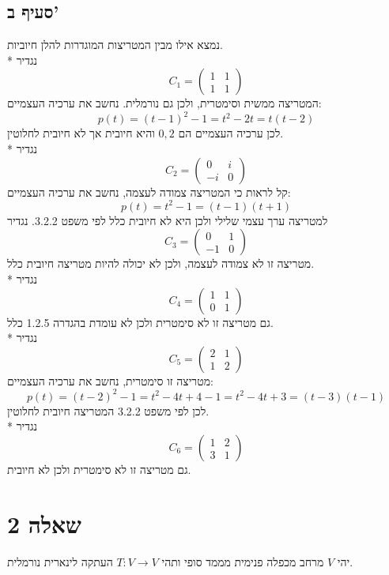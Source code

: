 \subsection{סעיף ב'}
נמצא אילו מבין המטריצות המוגדרות להלן חיוביות. \\*
נגדיר
\[
	C_1 = \begin{pmatrix}
		1 & 1 \\
		1 & 1
	\end{pmatrix}
\]
המטריצה ממשית וסימטרית, ולכן גם נורמלית. נחשב את ערכיה העצמיים:
\[
	p(t) = (t - 1)^2 - 1 = t^2 - 2t = t(t - 2)
\]
לכן ערכיה העצמיים הם $0, 2$ והיא חיובית אך לא חיובית לחלוטין. \\*
נגדיר
\[
	C_2 = \begin{pmatrix}
		0 & i \\
		-i & 0
	\end{pmatrix}
\]
קל לראות כי המטריצה צמודה לעצמה, נחשב את ערכיה העצמיים:
\[
	p(t) = t^2 - 1 = (t - 1)(t + 1)
\]
למטריצה ערך עצמי שלילי ולכן היא לא חיובית כלל לפי משפט 3.2.2.
נגדיר
\[
	C_3 = \begin{pmatrix}
		0 & 1 \\
		-1 & 0
	\end{pmatrix}
\]
מטריצה זו לא צמודה לעצמה, ולכן לא יכולה להיות מטריצה חיובית כלל. \\*
נגדיר
\[
	C_4 = \begin{pmatrix}
		1 & 1 \\
		0 & 1
	\end{pmatrix}
\]
גם מטריצה זו לא סימטרית ולכן לא עומדת בהגדרה 1.2.5 כלל. \\*
נגדיר
\[
	C_5 = \begin{pmatrix}
		2 & 1 \\
		1 & 2
	\end{pmatrix}
\]
מטריצה זו סימטרית, נחשב את ערכיה העצמיים:
\[
	p(t) = (t - 2)^2 - 1 = t^2 - 4t + 4 - 1 = t^2 - 4t + 3 = (t - 3)(t - 1)
\]
לכן לפי משפט 3.2.2 המטריצה חיובית לחלוטין. \\*
נגדיר
\[
	C_6 = \begin{pmatrix}
		1 & 2 \\
		3 & 1
	\end{pmatrix}
\]
גם מטריצה זו לא סימטרית ולכן לא חיובית.

\section{שאלה 2}
יהי $V$ מרחב מכפלה פנימית מממד סופי ותהי $T: V \to V$ העתקה לינארית נורמלית.

